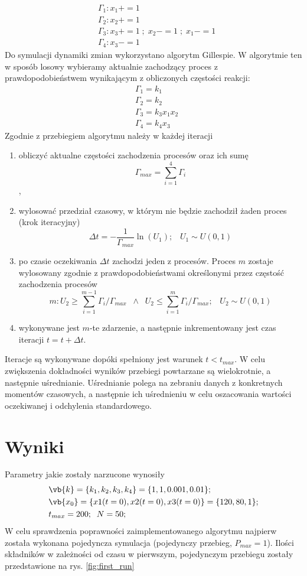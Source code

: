 \documentclass[a4paper,12pt]{article}
\begin{document}
\begin{align}
	&\Gamma_1: x_1 += 1 \\
	&\Gamma_2: x_2 += 1 \\
	&\Gamma_3: x_3 += 1 \; ; \; x_2 -= 1 \; ; \; x_1 -= 1 \\
	&\Gamma_4: x_3 -= 1
\end{align}
Do symulacji dynamiki zmian wykorzystano algorytm Gillespie. W algorytmie ten w sposób losowy wybieramy aktualnie zachodzący proces z prawdopodobieństwem wynikającym z obliczonych częstości reakcji:
\begin{align}
	&\Gamma_1 = k_1 \\
	&\Gamma_2 = k_2 \\
	&\Gamma_3 = k_3x_1x_2 \\
	&\Gamma_4 = k_4x_3
\end{align}
Zgodnie z przebiegiem algorytmu należy w każdej iteracji
\begin{enumerate}
	\item obliczyć aktualne częstości zachodzenia procesów oraz ich sumę
	\[ \Gamma_{max} = \sum_{i=1}^{4} \Gamma_i \],
	\item wylosować przedział czasowy, w którym nie będzie zachodził żaden proces (krok iteracyjny)
	\[ \Delta t = - \frac{1}{\Gamma_{max}} \ln(U_1); \; \; \; U_1 \sim U(0,1) \]
	\item po czasie oczekiwania $\Delta t$ zachodzi jeden z procesów. Proces $m$ zostaje wylosowany zgodnie z prawdopodobieństwami określonymi przez częstość zachodzenia procesów
	\[ m: U_2 \geq \sum_{i=1}^{m-1}\Gamma_i/\Gamma_{max} \; \; \land \; \; U_2 \leq \sum_{i=1}^{m}\Gamma_i/\Gamma_{max}; \; \; \; U_2 \sim U(0,1) \] 
	\item wykonywane jest $m$-te zdarzenie, a następnie inkrementowany jest czas iteracji $t =t+\Delta t$.
\end{enumerate}
Iteracje są wykonywane dopóki spełniony jest warunek $t < t_{max}$. W celu zwiększenia dokładności wyników przebiegi powtarzane są wielokrotnie, a następnie uśrednianie. 
Uśrednianie polega na zebraniu danych z konkretnych momentów czasowych, a następnie ich uśrednieniu w celu oszacowania wartości oczekiwanej i odchylenia standardowego. 

\section*{Wyniki}

Parametry jakie zostały narzucone wynosiły
\begin{align}
	 &\vb{k} = \{k_1, k_2, k_3, k_4\} = \{1,1,0.001,0.01\}; \nonumber \\
	 &\vb{x_0} = \{x1(t=0), x2(t=0), x3(t=0)\} = \{ 120, 80, 1\}; \nonumber \\  
	 &t_{max} =200 ; \; \; N = 50; \nonumber    
\end{align}
W celu sprawdzenia poprawności zaimplementowanego algorytmu najpierw została wykonana pojedyncza symulacja (pojedynczy przebieg, $P_{max} = 1$). 
Ilości składników w zależności od czasu w pierwszym, pojedynczym przebiegu zostały przedstawione na rys. \ref{fig:first_run}
\end{document}
